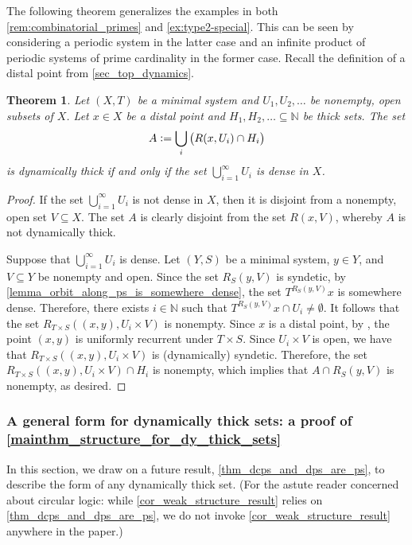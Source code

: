 \documentclass[letter,11pt]{article}
\theoremstyle{plain}
\newtheorem{theorem}{Theorem}
\theoremstyle{definition}
\theoremstyle{plain}
\theoremstyle{plain}
\numberwithin{equation}{section}
\newcommand{\N}{\mathbb{N}}
\newcommand{\defeq}{\vcentcolon=}
\begin{document}
The following theorem generalizes the examples in both \cref{rem:combinatorial_primes} and \cref{ex:type2-special}.  This can be seen by considering a periodic system in the latter case and an infinite product of periodic systems of prime cardinality in the former case.  Recall the definition of a distal point from \cref{sec_top_dynamics}.


\begin{theorem}%
\label{prop_description_of_dy_thick}
    Let $(X, T)$ be a minimal system and $U_1, U_2, \ldots$ be nonempty, open subsets of $X$. Let $x \in X$ be a distal point and $H_1, H_2, \ldots \subseteq \N$ be thick sets. The set
    \[
        A \defeq \bigcup_i \big(R(x,U_i) \cap H_i \big)
    \]
    is dynamically thick if and only if the set $\bigcup_{i=1}^\infty U_i$ is dense in $X$.
\end{theorem}

\begin{proof}
    If the set $\bigcup_{i=1}^\infty U_i$ is not dense in $X$, then it is disjoint from a nonempty, open set $V \subseteq X$. The set $A$ is clearly disjoint from the set $R(x,V)$, whereby $A$ is not dynamically thick.

    Suppose that $\bigcup_{i=1}^\infty U_i$ is dense. Let $(Y,S)$ be a minimal system, $y \in Y$, and $V \subseteq Y$ be nonempty and open.  Since the set $R_S(y,V)$ is syndetic, by \cref{lemma_orbit_along_ps_is_somewhere_dense}, the set $T^{R_S(y,V)} x$ is somewhere dense. Therefore, there exists $i \in \N$ such that $T^{R_S(y,V)} x \cap U_i \neq \emptyset$.  It follows that the set $R_{T \times S} ((x,y), U_i \times V)$ is nonempty. Since $x$ is a distal point, by \cite[Thm. 9.11]{furstenberg_book_1981}, the point $(x,y)$ is uniformly recurrent under $T \times S$.  Since $U_i \times V$ is open, we have that $R_{T \times S} ((x,y), U_i \times V)$ is (dynamically) syndetic. Therefore, the set $R_{T \times S} ((x,y), U_i \times V) \cap H_i$ is nonempty, which implies that $A \cap R_S(y,V)$ is nonempty, as desired.
\end{proof}



\subsubsection{A general form for dynamically thick sets: a proof of \cref{mainthm_structure_for_dy_thick_sets}}
\label{sec_general_form_of_dthick}

In this section, we draw on a future result, \cref{thm_dcps_and_dps_are_ps}, to describe the form of any dynamically thick set.  (For the astute reader concerned about circular logic: while \cref{cor_weak_structure_result} relies on \cref{thm_dcps_and_dps_are_ps}, we do not invoke \cref{cor_weak_structure_result} anywhere in the paper.)
\end{document}
